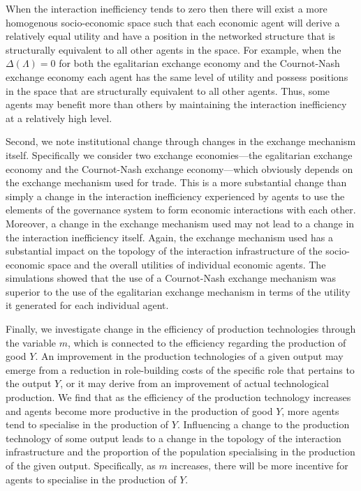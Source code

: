 When the interaction inefficiency tends to zero then there will exist a more homogenous socio-economic space such that each economic agent will derive a relatively equal utility and have a position in the networked structure that is structurally equivalent to all other agents in the space. For example, when the $\Delta(\Lambda) = 0$ for both the egalitarian exchange economy and the Cournot-Nash exchange economy each agent has the same level of utility and possess positions in the space that are structurally equivalent to all other agents. Thus, some agents may benefit more than others by maintaining the interaction inefficiency at a relatively high level.

Second, we note institutional change through changes in the exchange mechanism itself. Specifically we consider two exchange economies---the egalitarian exchange economy and the Cournot-Nash exchange economy---which obviously depends on the exchange mechanism used for trade. This is a more substantial change than simply a change in the interaction inefficiency experienced by agents to use the elements of the governance system to form economic interactions with each other. Moreover, a change in the exchange mechanism used may not lead to a change in the interaction inefficiency itself. Again, the exchange mechanism used has a substantial impact on the topology of the interaction infrastructure of the socio-economic space and the overall utilities of individual economic agents. The simulations showed that the use of a Cournot-Nash exchange mechanism was superior to the use of the egalitarian exchange mechanism in terms of the utility it generated for each individual agent.

Finally, we investigate change in the efficiency of production technologies through the variable $m$, which is connected to the efficiency regarding the production of good $Y$. An improvement in the production technologies of a given output may emerge from a reduction in role-building costs of the specific role that pertains to the output $Y$, or it may derive from an improvement of actual technological production. We find that as the efficiency of the production technology increases and agents become more productive in the production of good $Y$, more agents tend to specialise in the production of $Y$. Influencing a change to the production technology of some output leads to a change in the topology of the interaction infrastructure and the proportion of the population specialising in the production of the given output. Specifically, as $m$ increases, there will be more incentive for agents to specialise in the production of $Y$.

